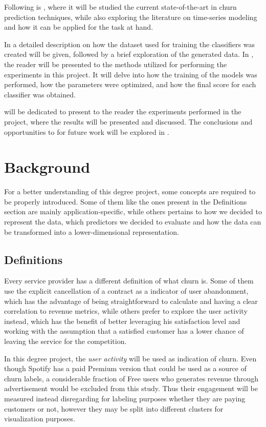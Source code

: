 \documentclass{kththesis}
\begin{document}
Following is , where it will be studied the current state-of-the-art in churn prediction techniques, while also exploring the literature on time-series modeling and how it can be applied for the task at hand. 

In  a detailed description on how the dataset used for training the classifiers was created will be given, followed by a brief exploration of the generated data. In , the reader will be presented to the methods utilized for performing the experiments in this project. It will delve into how the training of the models was performed, how the parameters were optimized, and how the final score for each classifier was obtained.

 will be dedicated to present to the reader the experiments performed in the project, where the results will be presented and discussed. The conclusions and opportunities to for future work will be explored in . 

\chapter{Background}
\label{cha:background}

For a better understanding of this degree project, some concepts are required to be properly introduced. Some of them like the ones present in the Definitions section are mainly application-specific, while others pertains to how we decided to represent the data, which predictors we decided to evaluate and how the data can be transformed into a lower-dimensional representation. 

\section{Definitions}
\label{sec:definitions}

Every service provider has a different definition of what churn is. Some of them use the explicit cancellation of a contract as a indicator of user abandonment, which has  the advantage of being straightforward to calculate and having a clear correlation to revenue metrics, while others prefer to explore the user activity instead, which has the benefit of better leveraging his satisfaction level and working with the assumption that a satisfied customer has a lower chance of leaving the service for the competition. 

In this degree project, the \emph{user activity} will be used as indication of churn. Even though Spotify has a paid Premium version that could be used as a source of churn labels, a considerable fraction of Free users who generates revenue through advertisement would be excluded from this study. Thus their engagement will be measured instead disregarding for labeling purposes whether they are paying customers or not, however they may be split into different clusters for visualization purposes.
\end{document}
